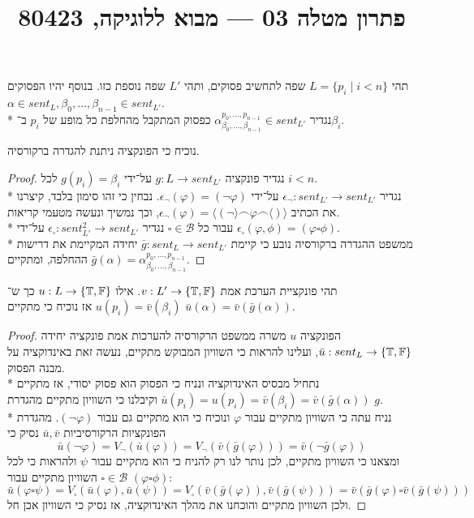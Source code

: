 
\title{פתרון מטלה 03 --- מבוא ללוגיקה, 80423}


\maketitle
\maketitleprint{}

\Question{}
תהי $L = \{ p_i \mid i < n \}$ שפה לתחשיב פסוקים, ותהי $L'$ שפה נוספת כזו. בנוסף יהיו הפסוקים $\alpha \in sent_L, \beta_0, \dots, \beta_{n - 1} \in sent_{L'}$. \\*
נגדיר $\alpha_{\beta_0, \dots, \beta_{n - 1}}^{p_0, \dots, p_{n - 1}} \in sent_{L'}$ כפסוק המתקבל מהחלפת כל מופע של $p_i$ ב־$\beta_i$.

\Subquestion{}
נוכיח כי הפונקציה ניתנת להגדרה ברקורסיה.
\begin{proof}
	נגדיר פונקציה $g : L \to sent_{L'}$ על־ידי $g(p_i) = \beta_i$ לכל $i < n$. \\*
	נגדיר $\epsilon_\lnot : sent_{L'} \to sent_{L'}$ על־ידי $\epsilon_\lnot(\varphi) = (\lnot \varphi)$.
	נבחין כי זהו סימון בלבד, קיצרנו את הכתיב $\epsilon_\lnot(\varphi) = \langle ( \lnot \rangle \frown \varphi \frown \langle ) \rangle$, וכך נמשיך ונעשה מטעמי קריאות. \\*
	עבור כל $\square \in \mathcal{B}$ נגדיר $\epsilon_\square : sent_{L'}^2 \to sent_{L'}$ על־ידי $\epsilon_\square(\varphi, \phi) = (\varphi \square \phi)$. \\*
	ממשפט ההגדרה ברקורסיה נובע כי קיימת $\bar{g} : sent_L \to sent_{L'}$ יחידה המקיימת את דרישות ההחלפה, ומתקיים $\bar{g}(\alpha) = \alpha_{\beta_0, \dots, \beta_{n - 1}}^{p_0, \dots, p_{n - 1}}$.
\end{proof}

\Subquestion{}
תהי פונקציית הערכת אמת $v : L' \to \{ \mathbb{T}, \mathbb{F} \}$.
אילו $u : L \to \{ \mathbb{T}, \mathbb{F} \}$ כך ש־$u(p_i) = \bar{v}(\beta_i)$ אז נוכיח כי מתקיים $\bar{u}(\alpha) = \bar{v}(\bar{g}(\alpha))$.
\begin{proof}
	הפונקציה $u$ משרה ממשפט הרקורסיה להערכות אמת פונקציה יחידה $\bar{u} : sent_L \to \{ \mathbb{T}, \mathbb{F} \}$, ועלינו להראות כי השוויון המבוקש מתקיים, נעשה זאת באינדוקציה על מבנה הפסוק. \\*
	נתחיל מבסיס האינדוקציה ונניח כי הפסוק הוא פסוק יסודי, אז מתקיים $\bar{u}(p_i) = u(p_i) = \bar{v}(\beta_i) = \bar{v}(\bar{g}(\alpha))$ וקיבלנו כי השוויון מתקיים מהגדרת $g$. \\*
	נניח עתה כי השוויון מתקיים עבור $\varphi$ ונוכיח כי הוא מתקיים גם עבור $(\lnot \varphi)$.
	מהגדרת הפונקציות הרקורסיביות $\bar{u}, \bar{v}$ נסיק כי
	\[
		\bar{u}(\lnot \varphi) = V_\lnot(\bar{u}(\varphi)) = V_\lnot(\bar{v}(\bar{g}(\varphi))) = \bar{v}(\lnot \bar{g}(\varphi))
	\]
	ומצאנו כי השוויון מתקיים, לכן נותר לנו רק להניח כי הוא מתקיים עבור $\psi$ ולהראות כי לכל $\square \in \mathcal{B}$ השוויון מתקיים עבור $(\varphi \square \phi)$:
	\[
		\bar{u}(\varphi \square \psi) = V_\square(\bar{u}(\varphi), \bar{u}(\psi)) = V_\square(\bar{v}(\bar{g}(\varphi)), \bar{v}(\bar{g}(\psi))) = \bar{v}(\bar{g}(\varphi) \square \bar{v}(\bar{g}(\psi)))
	\]
	ולכן השוויון מתקיים והוכחנו את מהלך האינדוקציה, אז נסיק כי השוויון אכן חל.
\end{proof}

